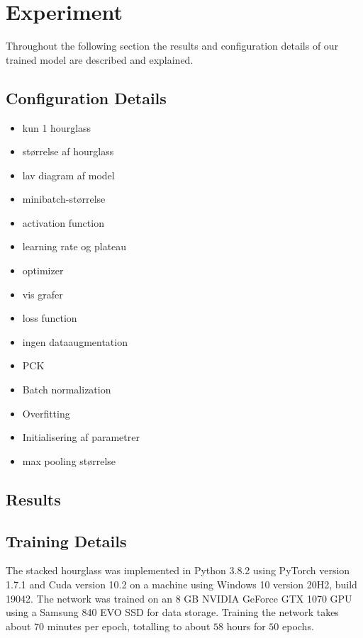 \documentclass[./main.tex]{subfiles}
\begin{document}
\section{Experiment}
Throughout the following section the results and configuration details of our trained model are described and explained.

\subsection{Configuration Details}
\begin{itemize}
    \item kun 1 hourglass
    \item størrelse af hourglass
    \item lav diagram af model
    \item minibatch-størrelse
    \item activation function
    \item learning rate og plateau
    \item optimizer
    \item vis grafer
    \item loss function
    \item ingen dataaugmentation
    \item PCK
    \item Batch normalization
    \item Overfitting
    \item Initialisering af parametrer
    \item max pooling størrelse
\end{itemize}

\subsection{Results}    

\subsection{Training Details}
The stacked hourglass was implemented in Python 3.8.2 using PyTorch version 1.7.1 and Cuda version 10.2 on a machine using Windows 10 version 20H2, build 19042. The network was trained on an 8 GB NVIDIA GeForce GTX 1070 GPU using a Samsung 840 EVO SSD for data storage. Training the network takes about $70$ minutes per epoch, totalling to about $58$ hours for $50$ epochs.
\end{document}
